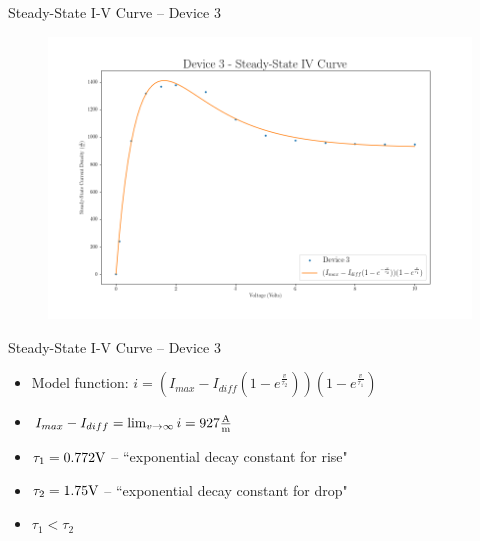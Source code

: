 \documentclass{beamer}
\begin{document}
\begin{frame}{Steady-State I-V Curve -- Device 3}
    \begin{figure}
        \centering
        \includegraphics[scale=0.35]{Figures/Device_3/SteadyState_Fit.png}
        \label{fig:dev3_ss}
    \end{figure}
\end{frame}

\begin{frame}{Steady-State I-V Curve -- Device 3}
    \begin{itemize}
        \item Model function: $ i = \left( I_{max} - I_{diff} \left( 1 - e^{\frac{v}{\tau_2}} \right) \right) \left( 1 - e^{\frac{v}{\tau_1}} \right)$
        \item $I_{max} - I_{diff} = \lim_{v\to\infty} i = 927 \frac{\textnormal{A}}{\textnormal{m}}$
        \item $\tau_1 = 0.772 \textnormal{V}$ -- ``exponential decay constant for rise"
        \item $\tau_2 = 1.75 \textnormal{V}$ -- ``exponential decay constant for drop"
        \item $\tau_1 < \tau_2$
    \end{itemize}
\end{frame}
\end{document}
